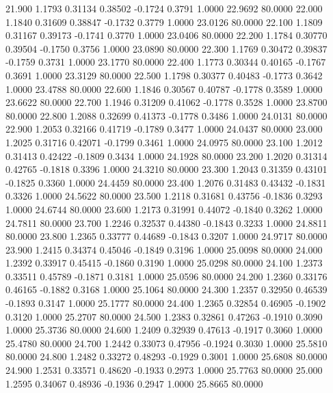   21.900   1.1793   0.31134   0.38502  -0.1724   0.3791   1.0000  22.9692  80.0000
  22.000   1.1840   0.31609   0.38847  -0.1732   0.3779   1.0000  23.0126  80.0000
  22.100   1.1809   0.31167   0.39173  -0.1741   0.3770   1.0000  23.0406  80.0000
  22.200   1.1784   0.30770   0.39504  -0.1750   0.3756   1.0000  23.0890  80.0000
  22.300   1.1769   0.30472   0.39837  -0.1759   0.3731   1.0000  23.1770  80.0000
  22.400   1.1773   0.30344   0.40165  -0.1767   0.3691   1.0000  23.3129  80.0000
  22.500   1.1798   0.30377   0.40483  -0.1773   0.3642   1.0000  23.4788  80.0000
  22.600   1.1846   0.30567   0.40787  -0.1778   0.3589   1.0000  23.6622  80.0000
  22.700   1.1946   0.31209   0.41062  -0.1778   0.3528   1.0000  23.8700  80.0000
  22.800   1.2088   0.32699   0.41373  -0.1778   0.3486   1.0000  24.0131  80.0000
  22.900   1.2053   0.32166   0.41719  -0.1789   0.3477   1.0000  24.0437  80.0000
  23.000   1.2025   0.31716   0.42071  -0.1799   0.3461   1.0000  24.0975  80.0000
  23.100   1.2012   0.31413   0.42422  -0.1809   0.3434   1.0000  24.1928  80.0000
  23.200   1.2020   0.31314   0.42765  -0.1818   0.3396   1.0000  24.3210  80.0000
  23.300   1.2043   0.31359   0.43101  -0.1825   0.3360   1.0000  24.4459  80.0000
  23.400   1.2076   0.31483   0.43432  -0.1831   0.3326   1.0000  24.5622  80.0000
  23.500   1.2118   0.31681   0.43756  -0.1836   0.3293   1.0000  24.6744  80.0000
  23.600   1.2173   0.31991   0.44072  -0.1840   0.3262   1.0000  24.7811  80.0000
  23.700   1.2246   0.32537   0.44380  -0.1843   0.3233   1.0000  24.8811  80.0000
  23.800   1.2365   0.33777   0.44689  -0.1843   0.3207   1.0000  24.9717  80.0000
  23.900   1.2415   0.34374   0.45046  -0.1849   0.3196   1.0000  25.0098  80.0000
  24.000   1.2392   0.33917   0.45415  -0.1860   0.3190   1.0000  25.0298  80.0000
  24.100   1.2373   0.33511   0.45789  -0.1871   0.3181   1.0000  25.0596  80.0000
  24.200   1.2360   0.33176   0.46165  -0.1882   0.3168   1.0000  25.1064  80.0000
  24.300   1.2357   0.32950   0.46539  -0.1893   0.3147   1.0000  25.1777  80.0000
  24.400   1.2365   0.32854   0.46905  -0.1902   0.3120   1.0000  25.2707  80.0000
  24.500   1.2383   0.32861   0.47263  -0.1910   0.3090   1.0000  25.3736  80.0000
  24.600   1.2409   0.32939   0.47613  -0.1917   0.3060   1.0000  25.4780  80.0000
  24.700   1.2442   0.33073   0.47956  -0.1924   0.3030   1.0000  25.5810  80.0000
  24.800   1.2482   0.33272   0.48293  -0.1929   0.3001   1.0000  25.6808  80.0000
  24.900   1.2531   0.33571   0.48620  -0.1933   0.2973   1.0000  25.7763  80.0000
  25.000   1.2595   0.34067   0.48936  -0.1936   0.2947   1.0000  25.8665  80.0000

